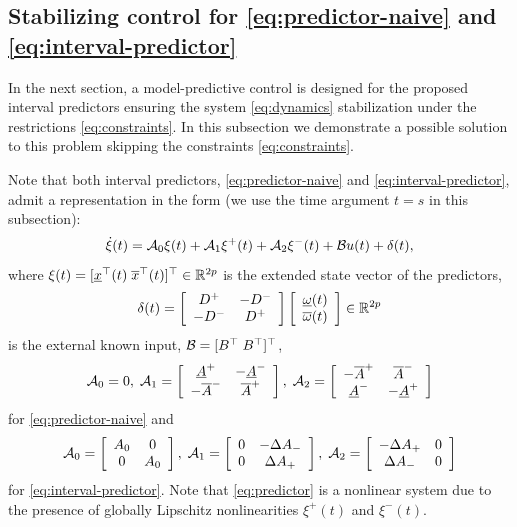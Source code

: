\documentclass[letterpaper, 10 pt, conference]{ieeeconf}  %
\begin{document}
\subsection{Stabilizing control for \eqref{eq:predictor-naive} and \eqref{eq:interval-predictor}}

In the next section, a model-predictive control is designed for
the proposed interval predictors ensuring the system \eqref{eq:dynamics}
stabilization under the restrictions \eqref{eq:constraints}. In this
subsection we demonstrate a possible solution to this problem
skipping the constraints \eqref{eq:constraints}.

Note that both interval predictors, \eqref{eq:predictor-naive} and
\eqref{eq:interval-predictor}, admit a representation in the form (we use the
time argument $t=s$ in this subsection):
\begin{equation}
\dot{\xi}(t)=\mathcal{A}_{0}\xi(t)+\mathcal{A}_{1}\xi^{+}(t)+\mathcal{A}_{2}\xi^{-}(t)+\mathcal{B} u(t)+\delta(t),\label{eq:predictor}
\end{equation}
where $\xi(t)=[\underline{x}^{\top}(t)\;\overline{x}^{\top}(t)]^{\top}\in\mathbb{R}^{2p}$
is the extended state vector of the predictors,
\[
\delta(t)=\left[\begin{array}{cc}
D^{+} & -D^{-}\\
-D^{-} & D^{+}
\end{array}\right]\left[\begin{array}{c}
\underline{\omega}(t)\\
\overline{\omega}(t)
\end{array}\right]\in\mathbb{R}^{2p}
\]
is the external known input, $\mathcal{B}=[B^{\top}\;B^{\top}]^{\top}$, 
\[
\mathcal{A}_{0}=0,\;\mathcal{A}_{1}=\left[\begin{array}{cc}
\underline{A}^{+} & -\underline{A}^{-}\\
-\overline{A}^{-} & \overline{A}^{+}
\end{array}\right],\;\mathcal{A}_{2}=\left[\begin{array}{cc}
-\overline{A}^{+} & \overline{A}^{-}\\
\underline{A}^{-} & -\underline{A}^{+}
\end{array}\right]
\]
for \eqref{eq:predictor-naive} and
\[
\mathcal{A}_{0}=\left[\begin{array}{cc}
A_{0} & 0\\
0 & A_{0}
\end{array}\right],\;\mathcal{A}_{1}=\left[\begin{array}{cc}
0 & -\Delta A_{-}\\
0 & \Delta A_{+}
\end{array}\right],\;\mathcal{A}_{2}=\left[\begin{array}{cc}
-\Delta A_{+} & 0\\
\Delta A_{-} & 0
\end{array}\right]
\]
for \eqref{eq:interval-predictor}. Note that \eqref{eq:predictor}
is a nonlinear system due to the presence of globally Lipschitz nonlinearities
$\xi^{+}(t)$ and $\xi^{-}(t)$. 
\end{document}
